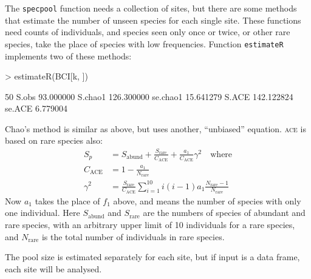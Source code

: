 \documentclass[a4paper,10pt]{amsart}
\begin{document}
The \texttt{specpool} function needs a collection of sites, but there
are some methods that estimate the number of unseen species for each
single site.  These functions need counts of individuals, and species
seen only once or twice, or other rare species, take the place of
species with low frequencies.  Function \texttt{estimateR} implements
two of these methods:
\begin{Schunk}
\begin{Sinput}
> estimateR(BCI[k, ])
\end{Sinput}
\begin{Soutput}
                 50
S.obs     93.000000
S.chao1  126.300000
se.chao1  15.641279
S.ACE    142.122824
se.ACE     6.779004
\end{Soutput}
\end{Schunk}
Chao's method is similar as above, but uses another, ``unbiased''
equation. \textsc{ace} is based on rare species also:
\begin{equation}
\begin{split}
S_p &= S_\mathrm{abund} + \frac{S_\mathrm{rare}}{C_\mathrm{ACE}} +
\frac{a_1}{C_\mathrm{ACE}} \gamma^2 \quad \text{where}\\
C_\mathrm{ACE} &= 1 - \frac{a_1}{N_\mathrm{rare}}\\
\gamma^2 &= \frac{S_\mathrm{rare}}{C_\mathrm{ACE}} \sum_{i=1}^{10} i
(i-1) a_1 \frac{N_\mathrm{rare} - 1}{N_\mathrm{rare}}
\end{split}
\end{equation}
Now $a_1$ takes the place of $f_1$ above, and means the number of
species with only one individual.
Here $S_\mathrm{abund}$ and $S_\mathrm{rare}$ are the numbers of
species of abundant and rare species, with an arbitrary upper limit of
10 individuals for a rare species, and $N_\mathrm{rare}$ is the total
number of individuals in rare species.

The pool size
is estimated separately for each site, but if input is a data frame,
each site will be analysed.
\end{document}
